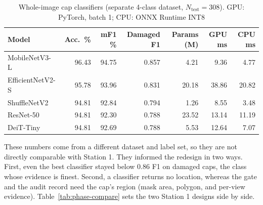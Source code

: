 \begin{table}[htbp]
\centering
\caption{Whole-image cap classifiers (separate 4-class dataset, $N_{\text{test}}=308$). GPU: PyTorch, batch 1; CPU: ONNX Runtime INT8}
\label{tab:classifiers}
\footnotesize
\setlength{\tabcolsep}{4pt}
\begin{tabular}{|l|r|r|r|r|r|r|}
\hline
\textbf{Model} & \textbf{Acc.\ \%} & \textbf{mF1 \%} & \textbf{Damaged F1} & \textbf{Params (M)} & \textbf{GPU ms} & \textbf{CPU ms} \\ \hline
MobileNetV3-L~\cite{howard2019} & 96.43 & 94.75 & 0.857 & 4.21 & 9.36 & 4.77 \\ \hline
EfficientNetV2-S~\cite{tan2021} & 95.78 & 93.96 & 0.831 & 20.18 & 38.86 & 20.82 \\ \hline
ShuffleNetV2~\cite{ma2018} & 94.81 & 92.84 & 0.794 & 1.26 & 8.55 & 3.48 \\ \hline
ResNet-50~\cite{he2016} & 94.81 & 92.30 & 0.788 & 23.52 & 13.14 & 11.19 \\ \hline
DeiT-Tiny~\cite{touvron2021} & 94.81 & 92.69 & 0.788 & 5.53 & 12.64 & 7.07 \\ \hline
\end{tabular}
\end{table}

These numbers come from a different dataset and label set, so they are not directly comparable with Station 1. They informed the redesign in two ways. First, even the best classifier stayed below 0.86 F1 on damaged caps, the class whose evidence is finest. Second, a classifier returns no location, whereas the gate and the audit record need the cap's region (mask area, polygon, and per-view evidence). Table~\ref{tab:phase-compare} sets the two Station 1 designs side by side.

